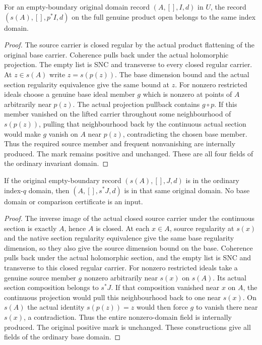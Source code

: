 \begin{lemma}
\label{hir:actual-section-projected-domain}
\leanok
For an empty-boundary original domain record $(A,[],I,d)$ in $U$, the
record $(s(A),[],p^*I,d)$ on the full genuine product open belongs to the
same index domain.
\end{lemma}
\begin{proof}
The source carrier is closed regular by the actual product flattening of the
original base carrier. Coherence pulls back under the actual holomorphic
projection. The empty list is SNC and transverse to every closed regular
carrier. At $z\in s(A)$ write $z=s(p(z))$. The base dimension bound and the
actual section regularity equivalence give the same bound at $z$.
For nonzero restricted ideals choose a genuine base ideal member $g$ which is
nonzero at points of $A$ arbitrarily near $p(z)$. The actual projection
pullback contains $g\circ p$. If this member vanished on the lifted carrier
throughout some neighbourhood of $s(p(z))$, pulling that neighbourhood back
by the continuous actual section would make $g$ vanish on $A$ near $p(z)$,
contradicting the chosen base member. Thus the required source member and
frequent nonvanishing are internally produced. The mark remains positive and
unchanged. These are all four fields of the ordinary invariant domain.
\end{proof}

\begin{lemma}
\label{hir:actual-section-original-source-domain}
\leanok
If the original empty-boundary record $(s(A),[],J,d)$ is in the ordinary
index-$q$ domain, then $(A,[],s^*J,d)$ is in that same original domain.
No base domain or comparison certificate is an input.
\end{lemma}
\begin{proof}
The inverse image of the actual closed source carrier under the continuous
section is exactly $A$, hence $A$ is closed. At each $x\in A$, source
regularity at $s(x)$ and the native section regularity equivalence give the
same base regularity dimension, so they also give the source dimension bound
on the base. Coherence pulls back under the actual holomorphic section, and
the empty list is SNC and transverse to this closed regular carrier.
For nonzero restricted ideals take a genuine source member $g$ nonzero
arbitrarily near $s(x)$ on $s(A)$. Its actual section composition belongs to
$s^*J$. If that composition vanished near $x$ on $A$, the continuous projection
would pull this neighbourhood back to one near $s(x)$. On $s(A)$ the actual
identity $s(p(z))=z$ would then force $g$ to vanish there near $s(x)$, a
contradiction. Thus the entire nonzero-domain field is internally produced.
The original positive mark is unchanged. These constructions give all fields
of the ordinary base domain.
\end{proof}

